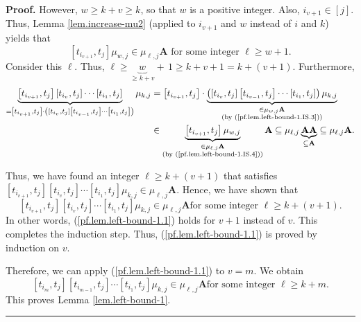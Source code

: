 \documentclass[numbers=enddot,12pt,final,onecolumn,notitlepage]{scrartcl}%
\theoremstyle{definition}
\newenvironment{proof}[1][Proof]{\noindent\textbf{#1.} }{\ \rule{0.5em}{0.5em}}
\begin{document}
\begin{proof}
However, $w\geq k+v\geq k$, so that $w$ is a positive integer. Also,
$i_{v+1}\in\left[  j\right]  $. Thus, Lemma \ref{lem.increase-mu2} (applied to
$i_{v+1}$ and $w$ instead of $i$ and $k$) yields that
\begin{equation}
\left[  t_{i_{v+1}},t_{j}\right]  \mu_{w,j}\in\mu_{\ell,j}\mathbf{A}\text{ for
some integer }\ell\geq w+1. \label{pf.lem.left-bound-1.IS.4}%
\end{equation}
Consider this $\ell$. Thus, $\ell\geq\underbrace{w}_{\geq k+v}+\,1\geq
k+v+1=k+\left(  v+1\right)  $. Furthermore,%
\begin{align*}
\underbrace{\left[  t_{i_{v+1}},t_{j}\right]  \left[  t_{i_{v}},t_{j}\right]
\cdots\left[  t_{i_{1}},t_{j}\right]  }_{=\left[  t_{i_{v+1}},t_{j}\right]
\cdot\left(  \left[  t_{i_{v}},t_{j}\right]  \left[  t_{i_{v-1}},t_{j}\right]
\cdots\left[  t_{i_{1}},t_{j}\right]  \right)  }\mu_{k,j}  &  =\left[
t_{i_{v+1}},t_{j}\right]  \cdot\underbrace{\left(  \left[  t_{i_{v}}%
,t_{j}\right]  \left[  t_{i_{v-1}},t_{j}\right]  \cdots\left[  t_{i_{1}}%
,t_{j}\right]  \right)  \mu_{k,j}}_{\substack{\in\mu_{w,j}\mathbf{A}%
\\\text{(by (\ref{pf.lem.left-bound-1.IS.3}))}}}\\
&  \in\underbrace{\left[  t_{i_{v+1}},t_{j}\right]  \mu_{w,j}}_{\substack{\in
\mu_{\ell,j}\mathbf{A}\\\text{(by (\ref{pf.lem.left-bound-1.IS.4}))}%
}}\mathbf{A}\subseteq\mu_{\ell,j}\underbrace{\mathbf{AA}}_{\subseteq
\mathbf{A}}\subseteq\mu_{\ell,j}\mathbf{A}.
\end{align*}


Thus, we have found an integer $\ell\geq k+\left(  v+1\right)  $ that
satisfies \newline$\left[  t_{i_{v+1}},t_{j}\right]  \left[  t_{i_{v}}%
,t_{j}\right]  \cdots\left[  t_{i_{1}},t_{j}\right]  \mu_{k,j}\in\mu_{\ell
,j}\mathbf{A}$. Hence, we have shown that%
\[
\left[  t_{i_{v+1}},t_{j}\right]  \left[  t_{i_{v}},t_{j}\right]
\cdots\left[  t_{i_{1}},t_{j}\right]  \mu_{k,j}\in\mu_{\ell,j}\mathbf{A}\text{
for some integer }\ell\geq k+\left(  v+1\right)  .
\]
In other words, (\ref{pf.lem.left-bound-1.1}) holds for $v+1$ instead of $v$.
This completes the induction step. Thus, (\ref{pf.lem.left-bound-1.1}) is
proved by induction on $v$.

Therefore, we can apply (\ref{pf.lem.left-bound-1.1}) to $v=m$. We obtain%
\[
\left[  t_{i_{m}},t_{j}\right]  \left[  t_{i_{m-1}},t_{j}\right]
\cdots\left[  t_{i_{1}},t_{j}\right]  \mu_{k,j}\in\mu_{\ell,j}\mathbf{A}\text{
for some integer }\ell\geq k+m.
\]
This proves Lemma \ref{lem.left-bound-1}.
\end{proof}
\end{document}
